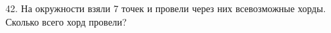 42. На окружности взяли 7 точек и провели через них всевозможные хорды. Сколько всего хорд провели?\\
